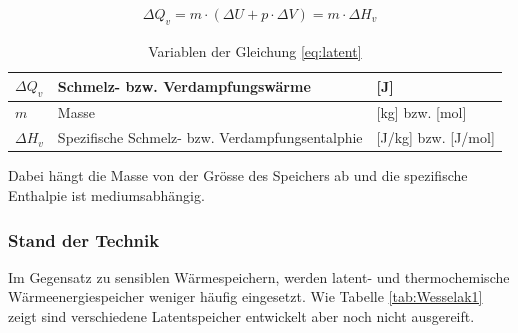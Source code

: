 \documentclass[11pt,a4paper]{scrartcl}
\begin{document}
\begin{align}
\Delta Q_v = m \cdot (\Delta U + p \cdot \Delta V) = m \cdot \Delta H_v
\label{eq:latent}
\end{align}

\begin{table}[h!]
\begin{center}
\caption{Variablen der Gleichung \ref{eq:latent}}
\begin{tabular}{|l|p{5cm}|l|}
\hline $\Delta Q_v$ & Schmelz- bzw. Verdampfungswärme & [J] \\
\hline $m$ & Masse & [kg] bzw. [mol] \\
\hline $\Delta H_v$ & Spezifische Schmelz- bzw. Verdampfungsentalphie & [J/kg]
bzw. [J/mol] \\
\hline
\end{tabular}
\end{center}
\end{table}

Dabei hängt die Masse von der Grösse des Speichers ab und die spezifische
Enthalpie ist mediumsabhängig.


\subsubsection{Stand der Technik}
Im Gegensatz zu sensiblen Wärmespeichern, werden latent- und thermochemische
Wärmeenergiespeicher weniger häufig eingesetzt. Wie Tabelle \ref{tab:Wesselak1}
zeigt sind verschiedene Latentspeicher entwickelt aber noch nicht ausgereift.
\end{document}
